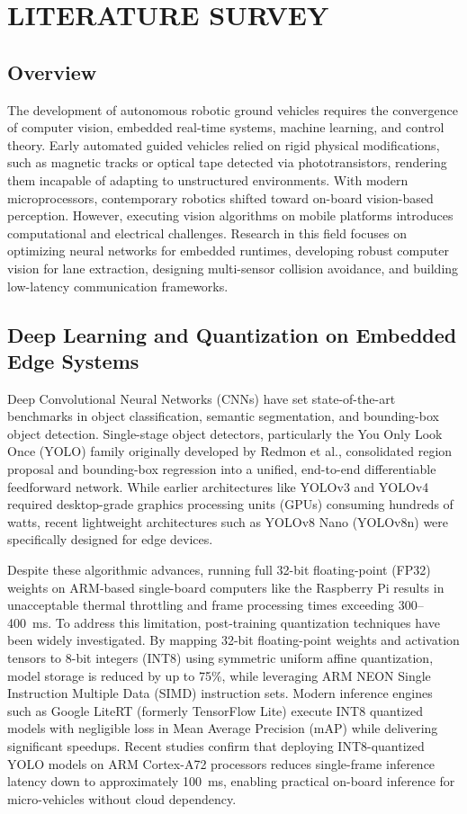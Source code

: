 \chapter{LITERATURE SURVEY}

\section{Overview}
The development of autonomous robotic ground vehicles requires the convergence of computer vision, embedded real-time systems, machine learning, and control theory. Early automated guided vehicles relied on rigid physical modifications, such as magnetic tracks or optical tape detected via phototransistors, rendering them incapable of adapting to unstructured environments. With modern microprocessors, contemporary robotics shifted toward on-board vision-based perception. However, executing vision algorithms on mobile platforms introduces computational and electrical challenges. Research in this field focuses on optimizing neural networks for embedded runtimes, developing robust computer vision for lane extraction, designing multi-sensor collision avoidance, and building low-latency communication frameworks.

\section{Deep Learning and Quantization on Embedded Edge Systems}
Deep Convolutional Neural Networks (CNNs) have set state-of-the-art benchmarks in object classification, semantic segmentation, and bounding-box object detection. Single-stage object detectors, particularly the You Only Look Once (YOLO) family originally developed by Redmon et al., consolidated region proposal and bounding-box regression into a unified, end-to-end differentiable feedforward network. While earlier architectures like YOLOv3 and YOLOv4 required desktop-grade graphics processing units (GPUs) consuming hundreds of watts, recent lightweight architectures such as YOLOv8 Nano (YOLOv8n) were specifically designed for edge devices.

Despite these algorithmic advances, running full 32-bit floating-point (FP32) weights on ARM-based single-board computers like the Raspberry Pi results in unacceptable thermal throttling and frame processing times exceeding 300--400~ms. To address this limitation, post-training quantization techniques have been widely investigated. By mapping 32-bit floating-point weights and activation tensors to 8-bit integers (INT8) using symmetric uniform affine quantization, model storage is reduced by up to 75\%, while leveraging ARM NEON Single Instruction Multiple Data (SIMD) instruction sets. Modern inference engines such as Google LiteRT (formerly TensorFlow Lite) execute INT8 quantized models with negligible loss in Mean Average Precision (mAP) while delivering significant speedups. Recent studies confirm that deploying INT8-quantized YOLO models on ARM Cortex-A72 processors reduces single-frame inference latency down to approximately 100~ms, enabling practical on-board inference for micro-vehicles without cloud dependency.

